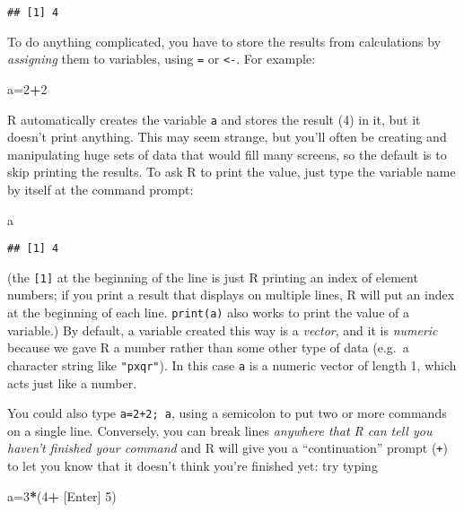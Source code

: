 \documentclass[11pt,]{article}
\newenvironment{Shaded}{\begin{snugshade}}{\end{snugshade}}
\newcommand{\DecValTok}[1]{\textcolor[rgb]{0.00,0.00,0.81}{#1}}
\newcommand{\StringTok}[1]{\textcolor[rgb]{0.31,0.60,0.02}{#1}}
\newcommand{\OperatorTok}[1]{\textcolor[rgb]{0.81,0.36,0.00}{\textbf{#1}}}
\newcommand{\NormalTok}[1]{#1}
\begin{document}
\begin{verbatim}
## [1] 4
\end{verbatim}

To do anything complicated, you have to store the results from
calculations by \emph{assigning} them to variables, using \texttt{=} or
\texttt{\textless{}-}. For example:

\begin{Shaded}
\begin{Highlighting}[]
\NormalTok{a=}\DecValTok{2}\OperatorTok{+}\DecValTok{2}
\end{Highlighting}
\end{Shaded}

R automatically creates the variable \texttt{a} and stores the result
(4) in it, but it doesn't print anything. This may seem strange, but
you'll often be creating and manipulating huge sets of data that would
fill many screens, so the default is to skip printing the results. To
ask R to print the value, just type the variable name by itself at the
command prompt:

\begin{Shaded}
\begin{Highlighting}[]
\NormalTok{a}
\end{Highlighting}
\end{Shaded}

\begin{verbatim}
## [1] 4
\end{verbatim}

(the \texttt{{[}1{]}} at the beginning of the line is just R printing an
index of element numbers; if you print a result that displays on
multiple lines, R will put an index at the beginning of each line.
\texttt{print(a)} also works to print the value of a variable.) By
default, a variable created this way is a \emph{vector}, and it is
\emph{numeric} because we gave R a number rather than some other type of
data (e.g.~a character string like \texttt{"pxqr"}). In this case
\texttt{a} is a numeric vector of length 1, which acts just like a
number.

You could also type \texttt{a=2+2;\ a}, using a semicolon to put two or
more commands on a single line. Conversely, you can break lines
\emph{anywhere that R can tell you haven't finished your command} and R
will give you a ``continuation'' prompt (\texttt{+}) to let you know
that it doesn't think you're finished yet: try typing

\begin{Shaded}
\begin{Highlighting}[]
\NormalTok{a=}\DecValTok{3}\OperatorTok{*}\NormalTok{(}\DecValTok{4}\OperatorTok{+}\StringTok{ }\NormalTok{[Enter]}
\DecValTok{5}\NormalTok{)}
\end{Highlighting}
\end{Shaded}
\end{document}
